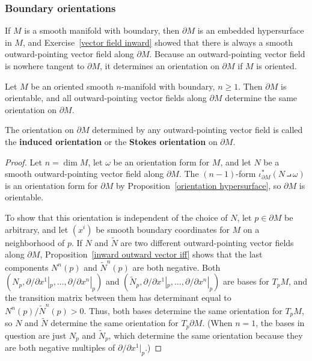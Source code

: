 \subsubsection{Boundary orientations}
If $M$ is a smooth manifold with boundary, then $\partial M$ is an embedded hypersurface in $M$, and Exercise~\ref{vector field inward} showed that there is always a smooth outward-pointing vector field along $\partial M$. Because an outward-pointing vector field is nowhere tangent to $\partial M$, it determines an orientation on $\partial M$ if $M$ is oriented.
\begin{proposition}
Let $M$ be an oriented smooth $n$-manifold with boundary, $n\geq1$. Then $\partial M$ is orientable, and all outward-pointing vector fields along $\partial M$ determine the same orientation on $\partial M$.
\end{proposition}
\begin{remark}
The orientation on $\partial M$ determined by any outward-pointing vector field is called the \textbf{induced orientation} or the \textbf{Stokes orientation} on $\partial M$.
\end{remark}
\begin{proof}
Let $n=\dim M$, let $\omega$ be an orientation form for $M$, and let $N$ be a smooth
outward-pointing vector field along $\partial M$. The $(n-1)$-form $\iota_{\partial M}^*(N\intprod\omega)$ is an orientation form for $\partial M$ by Proposition~\ref{orientation hypersurface}, so $\partial M$ is orientable.\par
To show that this orientation is independent of the choice of $N$, let $p\in\partial M$ be arbitrary, and let $(x^i)$ be smooth boundary coordinates for $M$ on a neighborhood of $p$. If $N$ and $\widetilde{N}$ are two different outward-pointing vector fields along $\partial M$, Proposition~\ref{inward outward vector iff} shows that the last components $N^n(p)$ and $\widetilde{N}^n(p)$ are both negative. Both $(N_p,\partial/\partial x^1|_p,\dots,\partial/\partial x^n|_p)$ and $(\widetilde{N}_p,\partial/\partial x^1|_p,\dots,\partial/\partial x^n|_p)$ are bases for $T_pM$, and the transition matrix between them has determinant equal to $N^n(p)/\widetilde{N}^n(p)>0$. Thus, both bases determine the same orientation for $T_pM$, so $N$ and $\widetilde{N}$ determine the same orientation for $T_p\partial M$. (When $n=1$, the bases in question are just $N_p$ and $\widetilde{N}_p$, which determine the same orientation because they are both negative multiples of $\partial/\partial x^1|_p$.)
\end{proof}
